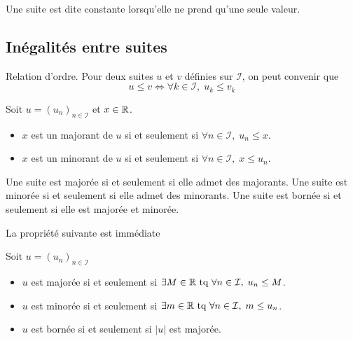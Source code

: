 Une suite est dite constante lorsqu'elle ne prend qu'une seule valeur.

\subsection{Inégalités entre suites}
Relation d'ordre. Pour deux suites $u$ et $v$ définies sur $\mathcal{I}$, on peut convenir que 
\begin{displaymath}
  u \leq v \Leftrightarrow \forall k \in \mathcal{I},\; u_k \leq v_k
\end{displaymath}
   
\begin{defi}
  Soit $u=(u_n)_{n \in \mathcal{I}}$ et $x\in \mathbb{R}$.
\begin{itemize}
  \item $x$ est un majorant de $u$ si et seulement si $\forall n \in \mathcal{I},\; u_n \leq x$.
  \item $x$ est un minorant de $u$ si et seulement si $\forall n \in \mathcal{I},\; x \leq u_n$.
\end{itemize}
Une suite est majorée si et seulement si elle admet des majorants. Une suite est minorée si et seulement si elle admet des minorants. Une suite est bornée si et seulement si elle est majorée et minorée. 
\end{defi}
La propriété suivante est immédiate
\begin{prop}
  Soit $u=(u_n)_{n \in \mathcal{I}}$
\begin{itemize}
  \item $u$ est majorée si et seulement si $\exists M\in \mathbb{R} \text{ tq } \forall n\in \mathcal{I},\; u_n \leq M$.
  \item $u$ est minorée si et seulement si $\exists m\in \mathbb{R} \text{ tq } \forall n\in \mathcal{I},\; m \leq u_n$.
  \item $u$ est bornée si et seulement si $|u|$ est majorée.
\end{itemize}
\end{prop}

